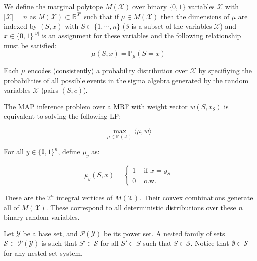 \begin{definition}
We define the marginal polytope $M(\mathcal{X})$ over binary $\{0,1\}$ variables $\mathcal{X}$ with $|\mathcal{X}| = n$ as $M (\mathcal{X}) \subset \mathbb{R}^{3^n}$ such that if $\mu \in M(\mathcal{X})$ then the dimensions of $\mu$ are indexed by $(S, x )$ with $S \subset \{1, \cdots, n\}$ ($S$ is a subset of the variables $\mathcal{X}$) and $x \in \{0,1\}^{|S|}$ is an assignment for these variables and the following relationship must be satisfied:
\begin{equation}
\mu(S, x) = \mathbb{P}_\mu( S = x)
\end{equation}

Each $\mu$ encodes (consistently) a probability distribution over $\mathcal{X}$ by specifiying the probabilities of all possible events in the sigma algebra generated by the random variables  $\mathcal{X}$ (pairs $(S, c)$).

The MAP inference problem over a MRF with weight vector $w(S, x_S)$ is equivalent to solving the following LP:

\begin{equation}
\max_{\mu \in \mathbb{M}(\mathcal{X}) } \langle \mu, w \rangle
\end{equation}

\end{definition}

For all $y \in \{0,1\}^n$, define $\mu_y$ as:

\begin{equation}\label{eq_vertex}
\mu_y(S,x) = \begin{cases}
             1 & \text{ if } x = y_S \\
             0 & \text{ o.w. } 
            \end{cases}
\end{equation}

These are the $2^n$ integral vertices of $M(\mathcal{X})$. Their convex combinations generate all of $M(\mathcal{X})$. These correspond to all deterministic distributions over these $n$ binary random variables. 
\newline

\begin{definition} 
Let $\mathcal{Y}$ be a base set, and $\mathcal{P}(\mathcal{Y})$ be its power set. A nested family of sets $\mathcal{S} \subset \mathcal{P}(\mathcal{Y})$ is such that $S' \in \mathcal{S}$ for all $S' \subset S$ such that $S  \in \mathcal{S}$. Notice that $\emptyset \in \mathcal{S}$ for any nested set system. 
\end{definition}


